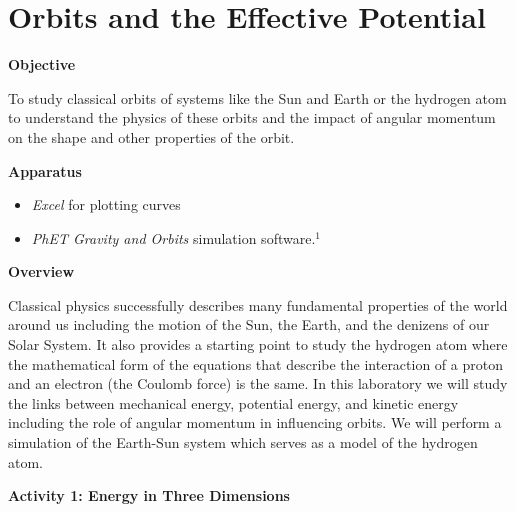 \section{Orbits and the Effective Potential}

\makelabheader %

\textbf{Objective}

To study classical orbits of systems like the Sun and Earth or the hydrogen atom 
to understand the physics of these orbits and the impact of angular
momentum on the shape and other properties of the orbit.

\textbf{Apparatus}

\begin{itemize}

\item {\it Excel} for plotting curves

\item {\it PhET Gravity and Orbits} simulation software$.^1$

\end{itemize}

\textbf{Overview}

Classical physics successfully describes many fundamental properties of the world
around us including the motion of the Sun, the Earth, and the denizens of our Solar System.
It also provides a starting point to study the hydrogen atom where the mathematical form of the
equations that describe the interaction of a proton and an electron (the Coulomb force)
is the same.
In this laboratory we will study the links between mechanical energy, potential energy,
and kinetic energy including the role of angular momentum in influencing 
orbits.
We will perform a simulation of the Earth-Sun system which serves as a model of
the hydrogen atom.

\textbf{Activity 1: Energy in Three Dimensions}


